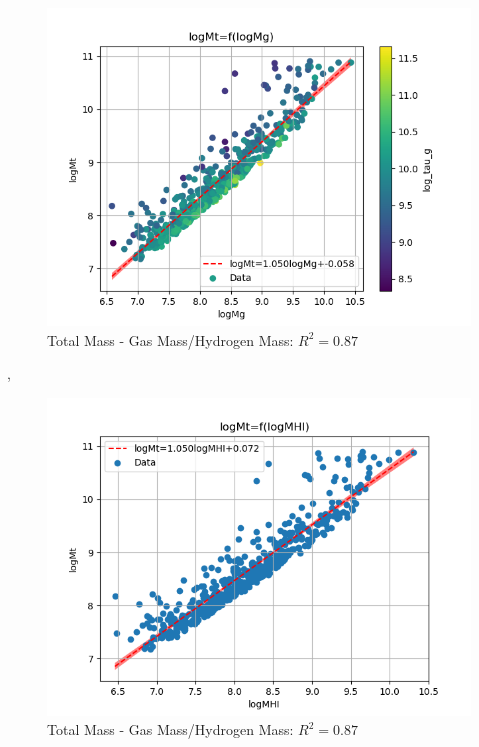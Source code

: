 \documentclass[a4paper]{article}
\begin{document}
\begin{figure}[htbp]
\centering
\includegraphics[width=.9\linewidth]{./graphs/logMg-logMt.png}
\caption{\label{Total Mass - Gas Mass}Total Mass - Gas Mass/Hydrogen Mass: \(R^2=0.87\)}
\end{figure},\begin{figure}[htbp]
\centering
\includegraphics[width=.9\linewidth]{./graphs/logMHI-logMt.png}
\caption{\label{Total Mass - Gas Mass}Total Mass - Gas Mass/Hydrogen Mass: \(R^2=0.87\)}
\end{figure}
\end{document}
